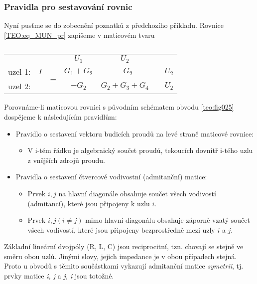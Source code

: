       \subsubsection{Pravidla pro sestavování rovnic}
        Nyní pusťme se do zobecnění poznatků z předchozího příkladu. Rovnice \ref{TEO:eq_MUN_pr} 
        zapíšeme v maticovém tvaru
        \begin{table}[ht!]
          \centering
          \begin{tabular}{c|c|c|c|c|c|c|}
             \multicolumn{1}{c}{}      & \multicolumn{1}{c}{}      & \multicolumn{1}{c}{} & 
             \multicolumn{1}{c}{$U_1$} & \multicolumn{1}{c}{$U_2$} & \multicolumn{1}{c}{} & 
             \multicolumn{1}{c}{}              \\
             \cline{2-2} \cline{4-5} \cline{7-7}
              uzel 1:  & $I$   & \multirow{2}{*}{=} & $G_1+G_2$ & $-G_2$         &   & $U_2$    \\
             \cline{2-2} \cline{4-5} \cline{7-7}
              uzel 2:  &       &                    & $-G_2$    & $G_2+G_3+G_4$  &   & $U_2$    \\
             \cline{2-2} \cline{4-5} \cline{7-7}
          \end{tabular}
          \caption*{ }
        \end{table}
        Porovnáme-li maticovou rovnici s původním schématem obvodu \ref{teo:fig025} 
        dospějeme k následujícím pravidlům:
        \begin{itemize}
         \item Pravidlo o sestavení vektoru budicích proudů na levé straně maticové rovnice:
           \begin{itemize}
             \item V $\text{i-tém}$ řádku je algebraický součet proudů, tekoucích dovnitř  
                   $\text{i-tého}$ uzlu z vnějších zdrojů proudu.
           \end{itemize}
         \item Pravidla o sestavení čtvercové vodivostní (admitanční) matice:
           \begin{itemize}
             \item Prvek $i, j$ na hlavní diagonále obsahuje součet všech vodivostí (admitancí),  
                   které jsou připojeny k uzlu $i$.
             \item Prvek $i, j (i \neq j)$ mimo hlavní diagonálu obsahuje záporně vzatý součet všech 
                   vodivostí, které jsou připojeny bezprostředně mezi uzly $i$ a $j$.
           \end{itemize}
        \end{itemize}
        Základní lineární dvojpóly (R, L, C) jsou reciprocitní, tzn. chovají se stejně ve směru 
        obou uzlů. Jinými slovy, jejich impedance je v obou případech stejná. Proto u obvodů s 
        těmito součástkami vykazují admitanční matice \emph{symetrii}, tj. prvky matice \emph{i, j} 
        a \emph{j, i} jsou totožné.

